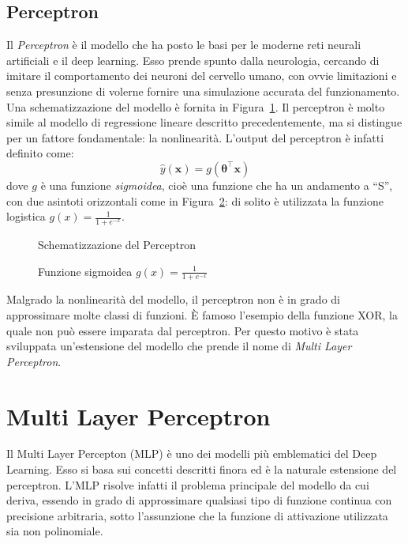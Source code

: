 \subsection{Perceptron}
Il \emph{Perceptron} è il modello che ha posto le basi per le moderne reti
neurali artificiali e il deep learning. Esso prende spunto dalla neurologia,
cercando di imitare il comportamento dei neuroni del cervello umano, con ovvie
limitazioni e senza presunzione di volerne fornire una simulazione accurata del
funzionamento. Una schematizzazione del modello è fornita in
Figura~\ref{fig:perceptron}.
Il perceptron è molto simile al modello di regressione lineare descritto
precedentemente, ma si distingue per un fattore fondamentale: la nonlinearità.
L'output del perceptron è infatti definito come:
\[\hat{y}(\bm x) = g(\bm \theta^\intercal \bm x)\]
dove $g$ è una funzione \emph{sigmoidea}, cioè una funzione che ha un andamento
a ``S'', con due asintoti orizzontali come in Figura~\ref{fig:sigmoid}: di
solito è utilizzata la funzione logistica $\displaystyle g(x) = \frac{1}{1 + e^{-x}}$.
\begin{figure}[htp]
  \caption{Schematizzazione del Perceptron}%
  \label{fig:perceptron}
\end{figure}

\begin{figure}[htp]
  \caption{Funzione sigmoidea $\displaystyle g(x) = \frac{1}{1 + e^{-x}}$ }%
  \label{fig:sigmoid}
\end{figure}

Malgrado la nonlinearità del modello, il perceptron non è in grado di
approssimare molte classi di funzioni. È famoso l'esempio della funzione XOR,
la quale non può essere imparata dal perceptron. Per questo motivo è stata
sviluppata un'estensione del modello che prende il nome di \emph{Multi Layer
  Perceptron}.
\section{Multi Layer Perceptron}
Il Multi Layer Percepton (MLP) è uno dei modelli più emblematici del Deep
Learning. Esso si basa sui concetti descritti finora ed è la naturale
estensione del perceptron. L'MLP risolve infatti il problema principale del
modello da cui deriva, essendo in grado di approssimare qualsiasi tipo di
funzione continua con precisione arbitraria, sotto l'assunzione che la funzione
di attivazione utilizzata sia non polinomiale\cite{universal-approximator}.

